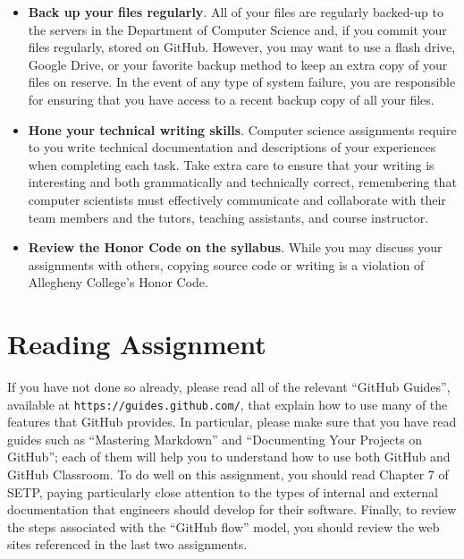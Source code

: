 \documentclass[11pt]{article}
\newcommand{\url}[1]{\lstinline{#1}}
\begin{document}
\begin{itemize}
\item {\bf Back up your files regularly}. All of your files are regularly backed-up to the servers in the Department of
  Computer Science and, if you commit your files regularly, stored on GitHub. However, you may want to use a flash
  drive, Google Drive, or your favorite backup method to keep an extra copy of your files on reserve. In the event of
  any type of system failure, you are responsible for ensuring that you have access to a recent backup copy of all your
  files.

\item {\bf Hone your technical writing skills}. Computer science assignments require to you write technical
  documentation and descriptions of your experiences when completing each task. Take extra care to ensure that your
  writing is interesting and both grammatically and technically correct, remembering that computer scientists must
  effectively communicate and collaborate with their team members and the tutors, teaching assistants, and course
  instructor.

\item {\bf Review the Honor Code on the syllabus}. While you may discuss your assignments with others, copying source
  code or writing is a violation of Allegheny College's Honor Code.

\end{itemize}

\vspace*{-1em}

\section*{Reading Assignment}

If you have not done so already, please read all of the relevant ``GitHub Guides'', available at
\url{https://guides.github.com/}, that explain how to use many of the features that GitHub provides. In particular,
please make sure that you have read guides such as ``Mastering Markdown'' and ``Documenting Your Projects on GitHub'';
each of them will help you to understand how to use both GitHub and GitHub Classroom. To do well on this assignment, you
should read Chapter 7 of SETP, paying particularly close attention to the types of internal and external documentation
that engineers should develop for their software. Finally, to review the steps associated with the ``GitHub flow''
model, you should review the web sites referenced in the last two assignments.
\end{document}

